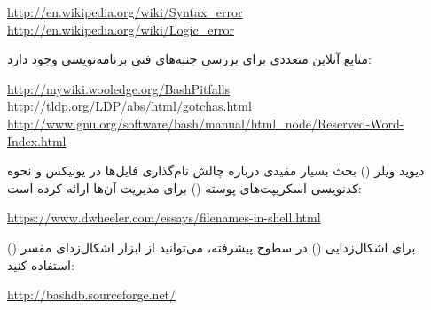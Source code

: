 \begin{latin}
\url{http://en.wikipedia.org/wiki/Syntax_error}\\
\url{http://en.wikipedia.org/wiki/Logic_error}
\end{latin}

منابع آنلاین متعددی برای بررسی جنبه‌های فنی برنامه‌نویسی  وجود دارد:

\begin{latin}
\url{http://mywiki.wooledge.org/BashPitfalls}\\
\url{http://tldp.org/LDP/abs/html/gotchas.html}\\
\url{http://www.gnu.org/software/bash/manual/html_node/Reserved-Word-Index.html}
\end{latin}

دیوید ویلر () بحث بسیار مفیدی درباره چالش نام‌گذاری فایل‌ها در یونیکس و نحوه کدنویسی اسکریپت‌های پوسته () برای مدیریت آن‌ها ارائه کرده است:

\begin{latin}
\url{https://www.dwheeler.com/essays/filenames-in-shell.html}
\end{latin}

برای اشکال‌زدایی () در سطوح پیشرفته، می‌توانید از ابزار اشکال‌زدای مفسر  () استفاده کنید:

\begin{latin}
\url{http://bashdb.sourceforge.net/}
\end{latin}